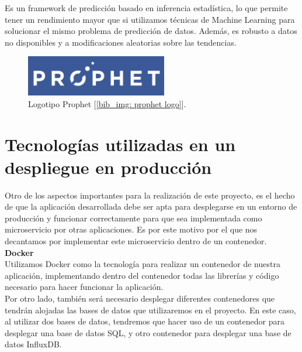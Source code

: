 \documentclass[a4paper, oneside, 12pt]{book}
\begin{document}
	\noindent Es un framework de predicción basado en inferencia estadística, lo que permite tener un rendimiento mayor que si utilizamos técnicas de Machine Learning para solucionar el mismo problema de predicción de datos. Además, es robusto a datos no disponibles y a modificaciones aleatorias sobre las tendencias. 
	
	\begin{figure}[h!]
		\begin{center}
			\includegraphics[width=0.55\textwidth]{img/prophet_logo.png}
			\caption{Logotipo Prophet [\ref{bib_img: prophet logo}].}
			\label{img: prophet logo}
		\end{center}
	\end{figure}
	
	\pagebreak
	
	\section[Despliegue en producción]{Tecnologías utilizadas en un despliegue en producción}
	
	\noindent Otro de los aspectos importantes para la realización de este proyecto, es el hecho de que la aplicación desarrollada debe ser apta para desplegarse en un entorno de producción y funcionar correctamente para que sea implementada como microservicio por otras aplicaciones. Es por este motivo por el que nos decantamos por implementar este microservicio dentro de un contenedor. \\
	
	\noindent \textbf{\large Docker} \\

	\noindent Utilizamos Docker como la tecnología para realizar un contenedor de nuestra aplicación, implementando dentro del contenedor todas las librerías y código necesario para hacer funcionar la aplicación. \\
	
	\noindent Por otro lado, también será necesario desplegar diferentes contenedores que tendrán alojadas las bases de datos que utilizaremos en el proyecto. En este caso, al utilizar dos bases de datos, tendremos que hacer uso de un contenedor para desplegar una base de datos SQL, y otro contenedor para desplegar una base de datos InfluxDB. \\ 
	
\end{document}
